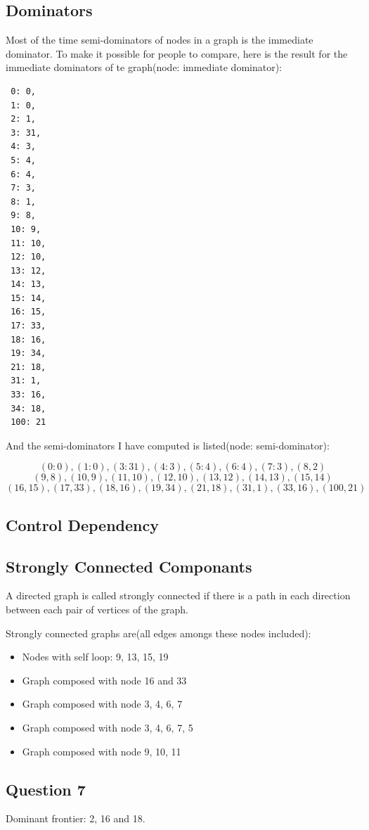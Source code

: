 \documentclass[12pt]{article}
\begin{document}
\subsection{Dominators}
Most of the time semi-dominators of nodes in a graph is the immediate
dominator. To make it possible for people to compare, here is the result
for the immediate dominators of te graph(node: immediate dominator):
\begin{verbatim}
 0: 0,
 1: 0,
 2: 1,
 3: 31,
 4: 3,
 5: 4,
 6: 4,
 7: 3,
 8: 1,
 9: 8,
 10: 9,
 11: 10,
 12: 10,
 13: 12,
 14: 13,
 15: 14,
 16: 15,
 17: 33,
 18: 16,
 19: 34,
 21: 18,
 31: 1,
 33: 16,
 34: 18,
 100: 21
\end{verbatim}

And the semi-dominators I have computed is listed(node: semi-dominator):

$$ (0: 0), (1: 0), (3: 31), (4: 3), (5: 4), (6: 4), (7: 3), (8, 2)$$
$$ (9, 8), (10, 9), (11, 10), (12, 10), (13, 12), (14, 13), (15, 14)$$
$$ (16, 15), (17, 33), (18, 16), (19, 34), (21, 18), (31, 1), (33,
16), (100, 21)$$

\subsection{Control Dependency}


\subsection{Strongly Connected Componants}
A directed graph is called strongly connected if there is a path in
each direction between each pair of vertices of the graph.

Strongly connected graphs are(all edges amongs these nodes included):
\begin{itemize}
\item Nodes with self loop: 9, 13, 15, 19
\item Graph composed with node 16 and 33
\item Graph composed with node 3, 4, 6, 7
\item Graph composed with node 3, 4, 6, 7, 5
\item Graph composed with node 9, 10, 11
\end{itemize}

\subsection{Question 7}
Dominant frontier: 2, 16 and 18.
\end{document}
